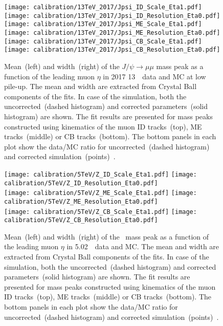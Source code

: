 	\begin{figure}[htb!]
		\begin{center}
			\texttt{[image: calibration/13TeV\_2017/Jpsi\_ID\_Scale\_Eta1.pdf]}
			\texttt{[image: calibration/13TeV\_2017/Jpsi\_ID\_Resolution\_Eta0.pdf]}\\
			\texttt{[image: calibration/13TeV\_2017/Jpsi\_ME\_Scale\_Eta1.pdf]}
			\texttt{[image: calibration/13TeV\_2017/Jpsi\_ME\_Resolution\_Eta0.pdf]}\\
			\texttt{[image: calibration/13TeV\_2017/Jpsi\_CB\_Scale\_Eta1.pdf]}
			\texttt{[image: calibration/13TeV\_2017/Jpsi\_CB\_Resolution\_Eta0.pdf]}
			\caption{Mean~(left) and width~(right) of the $J/\psi \to \mu\mu$ mass peak as a function of the leading muon $\eta$ in 2017 13~\TeV\ data and MC at low pile-up. The mean and width are extracted from Crystal Ball components of the fits. In case of the simulation, both the uncorrected~(dashed histogram) and corrected parameters~(solid histogram) are shown. The fit results are presented for mass peaks constructed using kinematics of the muon ID tracks~(top), ME tracks~(middle) or CB tracks~(bottom). The bottom panels in each plot show the data/MC ratio for uncorrected~(dashed histogram) and corrected simulation~(points)~\cite{int_note_muons}.}
			\label{fig:calib-Jpsi-13TeV}
		\end{center}
	\end{figure}

	\begin{figure}[htb!]
		\begin{center}
			\texttt{[image: calibration/5TeV/Z\_ID\_Scale\_Eta1.pdf]}
			\texttt{[image: calibration/5TeV/Z\_ID\_Resolution\_Eta0.pdf]}\\
			\texttt{[image: calibration/5TeV/Z\_ME\_Scale\_Eta1.pdf]}
			\texttt{[image: calibration/5TeV/Z\_ME\_Resolution\_Eta0.pdf]}\\
			\texttt{[image: calibration/5TeV/Z\_CB\_Scale\_Eta1.pdf]}
			\texttt{[image: calibration/5TeV/Z\_CB\_Resolution\_Eta0.pdf]}
			\caption{Mean~(left) and width~(right) of the \Zmm\ mass peak as a function of the leading muon $\eta$ in 5.02~\TeV\ data and MC. The mean and width are extracted from Crystal Ball components of the fits. In case of the simulation, both the uncorrected~(dashed histogram) and corrected parameters~(solid histogram) are shown. The fit results are presented for mass peaks constructed using kinematics of the muon ID tracks~(top), ME tracks~(middle) or CB tracks~(bottom). The bottom panels in each plot show the data/MC ratio for uncorrected~(dashed histogram) and corrected simulation~(points)~\cite{int_note_muons}.}
			\label{fig:calib-Z-5TeV}
		\end{center}
	\end{figure}
	
